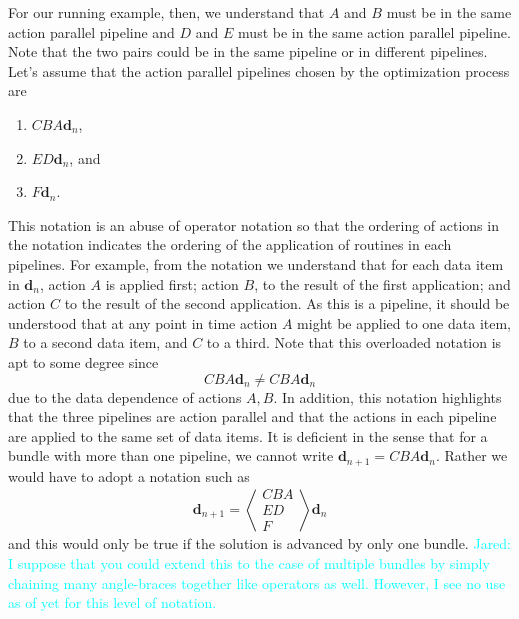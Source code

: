 \documentclass{article}
\newcommand{\Jared}[1]          {\textcolor{cyan}{Jared: #1}}
\begin{document}
For our running example, then, we understand that $A$ and $B$ must be in the
same action parallel pipeline and $D$ and $E$ must be in the same action parallel
pipeline.  Note that the two pairs could be in the same pipeline or in different
pipelines.  Let's assume that the action parallel pipelines chosen by the
optimization process are
\begin{enumerate}
\item{$CBA\mathbf{d}_n$},
\item{$ED\mathbf{d}_n$}, and
\item{$F\mathbf{d}_n$}.
\end{enumerate}
This notation is an abuse of operator notation so that the ordering of actions
in the notation indicates the ordering of the application of routines in each
pipelines.  For example, from the notation we understand that for each data item
in $\mathbf{d}_n$, action $A$ is applied first; action $B$, to the result of
the first application; and action $C$ to the result of the second
application.  As this is a pipeline, it should be understood that at any point
in time action $A$ might be applied to one data item, $B$ to a second data item,
and $C$ to a third.  Note that this overloaded notation is apt to some degree since
\[
CBA\mathbf{d}_n \not= CBA\mathbf{d}_n
\]
due to the data dependence of actions $A,B$.  In addition, this notation
highlights that the three pipelines are action parallel and that the actions in
each pipeline are applied to the same set of data items.  It is deficient in the
sense that for a bundle with more than one pipeline, we cannot write
$\mathbf{d}_{n+1} = CBA\mathbf{d}_n$.  Rather we would have to adopt a notation
such as
\[
\mathbf{d}_{n+1} =
\left\langle
\begin{array}{c}
CBA\\
ED\\
F
\end{array}
\right\rangle
\mathbf{d}_n
\]
and this would only be true if the solution is advanced by only one bundle.
\Jared{I suppose that you could extend this to the case of multiple bundles by
simply chaining many angle-braces together like operators as well.  However, I
see no use as of yet for this level of notation.}\\
\end{document}
